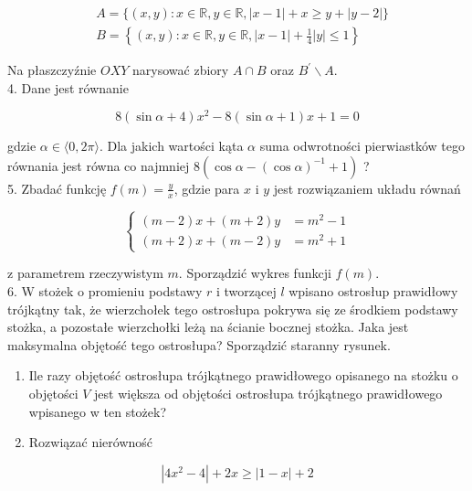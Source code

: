 \documentclass[10pt]{article}
\begin{document}
$$
\begin{aligned}
& A=\{(x, y): x \in \mathbb{R}, y \in \mathbb{R},|x-1|+x \geqslant y+|y-2|\} \\
& B=\left\{(x, y): x \in \mathbb{R}, y \in \mathbb{R},|x-1|+\frac{1}{4}|y| \leqslant 1\right\}
\end{aligned}
$$

Na płaszczyźnie $O X Y$ narysować zbiory $A \cap B$ oraz $B^{\prime} \backslash A$.\\
4. Dane jest równanie

$$
8(\sin \alpha+4) x^{2}-8(\sin \alpha+1) x+1=0
$$

gdzie $\alpha \in\langle 0,2 \pi\rangle$. Dla jakich wartości kąta $\alpha$ suma odwrotności pierwiastków tego równania jest równa co najmniej $8\left(\cos \alpha-(\cos \alpha)^{-1}+1\right)$ ?\\
5. Zbadać funkcję $f(m)=\frac{y}{x}$, gdzie para $x$ i $y$ jest rozwiązaniem układu równań

$$
\left\{\begin{aligned}
(m-2) x+(m+2) y & =m^{2}-1 \\
(m+2) x+(m-2) y & =m^{2}+1
\end{aligned}\right.
$$

z parametrem rzeczywistym $m$. Sporządzić wykres funkcji $f(m)$.\\
6. W stożek o promieniu podstawy $r$ i tworzącej $l$ wpisano ostrosłup prawidłowy trójkątny tak, że wierzchołek tego ostrosłupa pokrywa się ze środkiem podstawy stożka, a pozostałe wierzchołki leżą na ścianie bocznej stożka. Jaka jest maksymalna objętość tego ostrosłupa? Sporządzić staranny rysunek.

\begin{enumerate}
  \item Ile razy objętość ostrosłupa trójkątnego prawidłowego opisanego na stożku o objętości $V$ jest większa od objętości ostrosłupa trójkątnego prawidłowego wpisanego w ten stożek?
  \item Rozwiązać nierówność
\end{enumerate}

$$
\left|4 x^{2}-4\right|+2 x \geqslant|1-x|+2
$$
\end{document}
